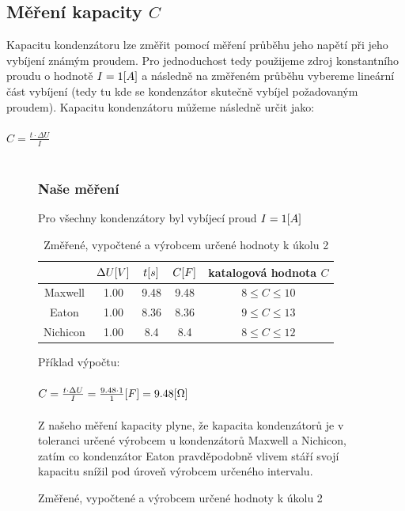 \documentclass{article}
\begin{document}
\subsection*{Měření kapacity \(C\)}
Kapacitu kondenzátoru lze změřit pomocí měření průběhu jeho napětí při jeho vybíjení známým proudem.
Pro jednoduchost tedy použijeme zdroj konstantního proudu o hodnotě \(I = 1\-[A]\) a následně na změřeném průběhu vybereme lineární část vybíjení (tedy tu kde se kondenzátor skutečně vybíjel požadovaným proudem).
Kapacitu kondenzátoru můžeme následně určit jako:
\\ \\
\Large
\(
  C = \frac{t\cdot \Delta U}{I}
\)
\normalsize
\\ \\

\begin{figure}[H]
  \begin{minipage}[t]{\textwidth}
    \subsubsection*{Naše měření}
    Pro všechny kondenzátory byl vybíjecí proud \(I = 1\-[A]\)
    \begin{table}[H]
      \centering
      \begin{tabular}{|c|c|c||c|c|}
        \hline
                    &	\(\Delta U\-[V]\)  & \(t\-[s]\)   & \(C\-[F]\)  & katalogová hodnota \(C\)  \\ \hline
          Maxwell   & 1.00               & 9.48         & 9.48        & \(8 \leq C \leq 10\)      \\ \hline
          Eaton     & 1.00               & 8.36         & 8.36        & \(9 \leq C \leq 13\)      \\ \hline
          Nichicon  & 1.00               & 8.4          & 8.4         & \(8 \leq C \leq 12\)      \\ \hline
      \end{tabular}
      \caption{\label{C} Změřené, vypočtené a výrobcem určené hodnoty k úkolu 2}
    \end{table}
    Příklad výpočtu:
    \\ \\
    \Large
    \(
      C = \frac{t\cdot \Delta U}{I} = \frac{9.48 \cdot 1}{1}\-[F]=9.48\-[\Omega]
    \)
    \normalsize
    \\ \\
    Z našeho měření kapacity plyne, že kapacita kondenzátorů je v toleranci určené výrobcem u kondenzátorů Maxwell a Nichicon, zatím co kondenzátor Eaton pravděpodobně vlivem stáří svojí kapacitu snížil pod úroveň výrobcem určeného intervalu.  
  \end{minipage}
\end{figure}
\end{document}
